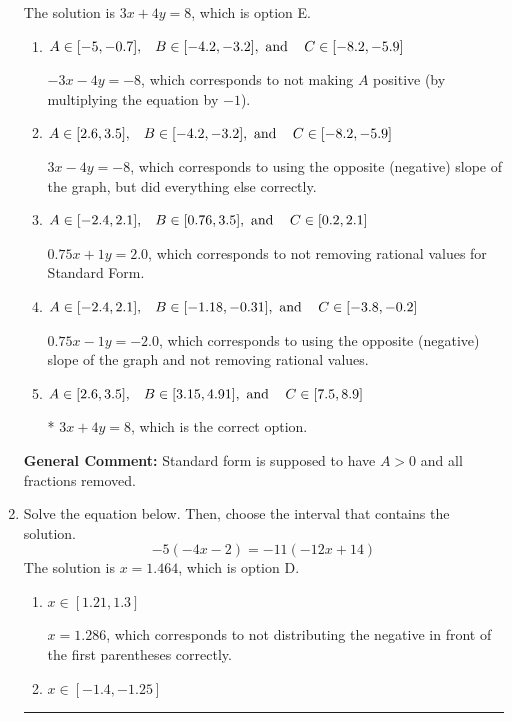 \documentclass{extbook}[14pt]
\newcommand{\litem}[1]{\item #1

\rule{\textwidth}{0.4pt}}
\begin{document}
\begin{enumerate}
{The solution is \( 3x + 4y = 8 \), which is option E.\begin{enumerate}[label=\Alph*.]
\item \( A \in [-5, -0.7], \hspace{3mm} B \in [-4.2, -3.2], \text{ and } \hspace{3mm} C \in [-8.2, -5.9] \)

 $-3x - 4y = -8$, which corresponds to not making $A$ positive (by multiplying the equation by $-1$).
\item \( A \in [2.6, 3.5], \hspace{3mm} B \in [-4.2, -3.2], \text{ and } \hspace{3mm} C \in [-8.2, -5.9] \)

 $3x - 4y = -8$, which corresponds to using the opposite (negative) slope of the graph, but did everything else correctly.
\item \( A \in [-2.4, 2.1], \hspace{3mm} B \in [0.76, 3.5], \text{ and } \hspace{3mm} C \in [0.2, 2.1] \)

 $0.75x + 1y = 2.0$, which corresponds to not removing rational values for Standard Form.
\item \( A \in [-2.4, 2.1], \hspace{3mm} B \in [-1.18, -0.31], \text{ and } \hspace{3mm} C \in [-3.8, -0.2] \)

 $0.75x - 1y = -2.0$, which corresponds to using the opposite (negative) slope of the graph and not removing rational values.
\item \( A \in [2.6, 3.5], \hspace{3mm} B \in [3.15, 4.91], \text{ and } \hspace{3mm} C \in [7.5, 8.9] \)

* $3x + 4y = 8$, which is the correct option.
\end{enumerate}

\textbf{General Comment:} Standard form is supposed to have $A > 0$ and all fractions removed.
}
\litem{
Solve the equation below. Then, choose the interval that contains the solution.
\[ -5(-4x -2) = -11(-12x + 14) \]
The solution is \( x = 1.464 \), which is option D.\begin{enumerate}[label=\Alph*.]
\item \( x \in [1.21, 1.3] \)

$x = 1.286$, which corresponds to not distributing the negative in front of the first parentheses correctly.
\item \( x \in [-1.4, -1.25] \)


\end{enumerate}}
\end{enumerate}
\end{document}
